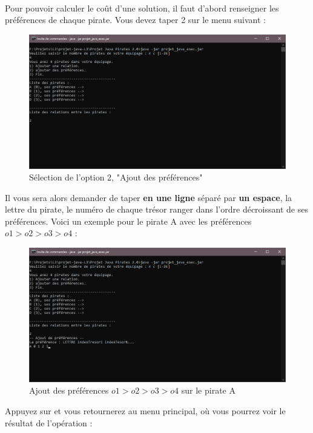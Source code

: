 \documentclass[12pt]{article}
\begin{document}
\paragraph{} Pour pouvoir calculer le coût d'une solution, il faut d'abord renseigner les préférences de chaque pirate. Vous devez taper 2 sur le menu suivant :
\begin{figure}[H]
\includegraphics[width=16cm]{ajout_pref_1}
\centering
\caption{Sélection de l'option 2, "Ajout des préférences"}
\end{figure}
Il vous sera alors demander de taper \textbf{en une ligne} séparé par \textbf{un espace}, la lettre du pirate, le numéro de chaque trésor ranger dans l'ordre décroissant de ses préférences. Voici un exemple pour le pirate A avec les préférences $o1>o2>o3>o4$ :
\begin{figure}[H]
\includegraphics[width=16cm]{ajout_pref_2}
\centering
\caption{Ajout des préférences $o1>o2>o3>o4$ sur le pirate A}
\end{figure}
Appuyez sur  et vous retournerez au menu principal, où vous pourrez voir le résultat de l'opération :
\end{document}
